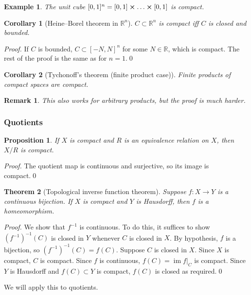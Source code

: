 \documentclass{article}
\theoremstyle{plain}\theoremheaderfont{\normalfont\itshape}\theorembodyfont{\rmfamily}\theoremseparator{.}\newtheorem*{rem}{Remark}\newtheorem*{ex}{Example}\newtheorem*{proof}{Proof}\newtheorem*{altp}{Alternative proof}
\theoremstyle{plain}\theoremheaderfont{\normalfont\bfseries}\theorembodyfont{\rmfamily}\theoremseparator{.}\newtheorem{thm}{Theorem}[section]\newtheorem{lem}[thm]{Lemma}\newtheorem{prop}[thm]{Proposition}\newtheorem*{cor}{Corollary}\newtheorem{defn}[thm]{Definition}\newtheorem{clm}[thm]{Claim}\newtheorem{clminproof}{Claim}
\theoremstyle{break}\theoremheaderfont{\normalfont\itshape}\theorembodyfont{\rmfamily}\theoremseparator{.\medskip}\newtheorem*{proofskip}{Proof}\newtheorem*{exs}{Examples}\newtheorem*{rems}{Remarks}
\theoremstyle{break}\theoremheaderfont{\normalfont\bfseries}\theorembodyfont{\rmfamily}\theoremseparator{.\medskip}\newtheorem{lemskip}[thm]{Lemma}\newtheorem{defnskip}[thm]{Definition}\newtheorem{propskip}[thm]{Proposition}\newtheorem{thmskip}[thm]{Theorem}
\newcommand{\qed}{\hfill\ensuremath{\Box}}
\DeclareMathOperator{\im}{im}
\begin{document}
    \begin{ex}
        The unit cube \([0,1]^n=[0,1]\cross\dots\cross[0,1]\) is compact.
    \end{ex}
    \begin{cor}[Heine--Borel theorem in \(\mathbb{R}^n\)]
        \(C\subset\mathbb{R}^n\) is compact iff \(C\) is closed and bounded.
    \end{cor}
    \begin{proof}
        If \(C\) is bounded, \(C\subset[-N,N]^n\) for some \(N\in\mathbb{R}\), which is compact. The rest of the proof is the same as for \(n=1\).\qed
    \end{proof}
    \begin{cor}[Tychonoff's theorem (finite product case)]
        Finite products of compact spaces are compact.
    \end{cor}
    \begin{rem}
        This also works for arbitrary products, but the proof is much harder.
    \end{rem}
    \subsubsection{Quotients}
    \begin{prop}
        If \(X\) is compact and \(R\) is an equivalence relation on \(X\), then \(X/R\) is compact.
    \end{prop}
    \begin{proof}
        The quotient map is continuous and surjective, so its image is compact.\qed
    \end{proof}

    \begin{thm}[Topological inverse function theorem]
        Suppose \(f:X\to Y\) is a continuous bijection. If \(X\) is compact and \(Y\) is Hausdorff, then \(f\) is a homeomorphism.
    \end{thm}
    \begin{proof}
        We show that \(f^{-1}\) is continuous. To do this, it suffices to show \((f^{-1})^{-1}(C)\) is closed in \(Y\) whenever \(C\) is closed in \(X\). By hypothesis, \(f\) is a bijection, so \((f^{-1})^{-1}(C)=f(C)\). Suppose \(C\) is closed in \(X\). Since \(X\) is compact, \(C\) is compact. Since \(f\) is continuous, \(f(C)=\im f|_C\) is compact. Since \(Y\) is Hausdorff and \(f(C)\subset Y\) is compact, \(f(C)\) is closed as required.\qed
    \end{proof}

    We will apply this to quotients.
\end{document}
